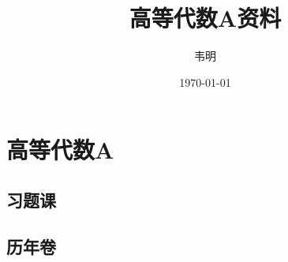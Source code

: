 \documentclass[12pt,lang=en,thmcnt=subsection,pad]{elegantbook}
\title{高等代数A资料}
\author{韦明}
\date{\today}
\numberwithin{equation}{section}
\begin{document}
\maketitle
\frontmatter

\tableofcontents

\mainmatter
\chapter{高等代数A}
\section{习题课}


\newpage

\section{历年卷}
\newpage

\newpage

\newpage

\newpage

\newpage

\newpage

\end{document}
